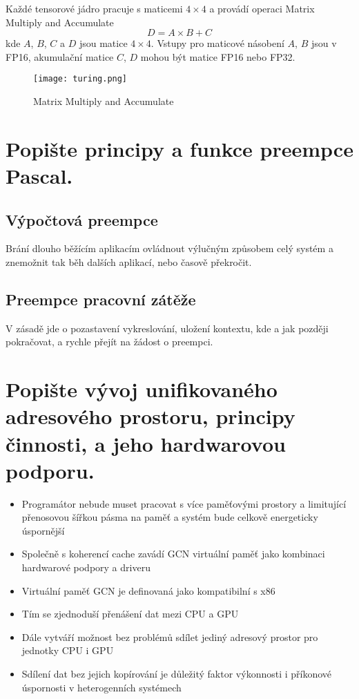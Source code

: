 	Každé tensorové jádro pracuje s maticemi $4 \times 4$ a provádí operaci Matrix Multiply and Accumulate
	$$D = A \times B + C$$
	kde $A$, $B$, $C$ a $D$ jsou matice $4 \times 4$.
	Vstupy pro maticové násobení $A$, $B$ jsou v FP16, akumulační matice $C$, $D$ mohou být matice FP16 nebo FP32.
	\begin{figure}[h]
		\centering
		\texttt{[image: turing.png]}
		\caption{Matrix Multiply and Accumulate}
		\label{fig:turing}
	\end{figure}
	

\section{Popište principy a funkce preempce Pascal.}
	\subsection*{Výpočtová preempce}
		Brání dlouho běžícím aplikacím ovládnout výlučným způsobem celý systém a znemožnit tak běh dalších aplikací, nebo časově překročit.
	
	\subsection*{Preempce pracovní zátěže}
		V zásadě jde o pozastavení vykreslování, uložení kontextu, kde a jak později pokračovat, a rychle přejít na žádost o preempci.

	
	
\section{Popište vývoj unifikovaného adresového prostoru, principy činnosti, a jeho hardwarovou podporu.}
	\begin{itemize}
		\setlength\itemsep{0em}
		\item Programátor nebude muset pracovat s více paměťovými prostory a limitující přenosovou šířkou pásma na paměť a systém bude celkově energeticky úspornější
		\item Společně s koherencí cache zavádí GCN virtuální paměť jako kombinaci hardwarové podpory a driveru
		\item Virtuální paměť GCN je definovaná jako kompatibilní s x86
		\item Tím se zjednoduší přenášení dat mezi CPU a GPU
		\item Dále vytváří možnost bez problémů sdílet jediný adresový prostor pro jednotky CPU i GPU
		\item Sdílení dat bez jejich kopírování je důležitý faktor výkonnosti i příkonové úspornosti v heterogenních systémech
	\end{itemize}
	
